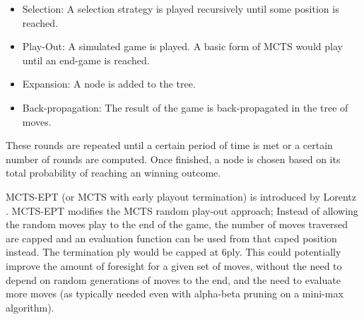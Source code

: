 \documentclass[12pt,a4paper]{article}
\begin{document}
    \begin{itemize}
        \item Selection: A selection strategy is played recursively until some position is reached. 
        \item Play-Out: A simulated game is played. A basic form of MCTS would play until an end-game is reached.
        \item Expansion: A node is added to the tree.
        \item Back-propagation: The result of the game is back-propagated in the tree of moves.
    \end{itemize}

    These rounds are repeated until a certain period of time is met or a certain number of rounds are computed. Once finished, a node is chosen based on its total probability of reaching an winning outcome.
    

    MCTS-EPT (or MCTS with early playout termination) is introduced by Lorentz \cite{lorentz_using_2016}. MCTS-EPT modifies the MCTS random play-out approach; Instead of allowing the random moves play to the end of the game, the number of moves traversed are capped and an evaluation function can be used from that caped position instead. The termination ply would be capped at 6ply. This could potentially improve the amount of foresight for a given set of moves, without the need to depend on random generations of moves to the end, and the need to evaluate more moves (as typically needed even with alpha-beta pruning on a mini-max algorithm).
\end{document}
